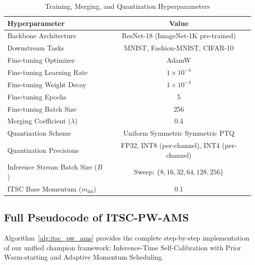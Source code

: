 \documentclass{article}
\theoremstyle{plain}
\theoremstyle{definition}
\theoremstyle{remark}
\begin{document}
\begin{table}[h]
  \caption{Training, Merging, and Quantization Hyperparameters}
  \label{tab:hyperparams}
  \centering
  \begin{tabular}{lc}
    \toprule
    \textbf{Hyperparameter} & \textbf{Value} \\
    \midrule
    Backbone Architecture & ResNet-18 (ImageNet-1K pre-trained) \\
    Downstream Tasks & MNIST, Fashion-MNIST, CIFAR-10 \\
    Fine-tuning Optimizer & AdamW \\
    Fine-tuning Learning Rate & $1 \times 10^{-4}$ \\
    Fine-tuning Weight Decay & $1 \times 10^{-4}$ \\
    Fine-tuning Epochs & 5 \\
    Fine-tuning Batch Size & 256 \\
    Merging Coefficient ($\lambda$) & 0.4 \\
    Quantization Scheme & Uniform Symmetric Symmetric PTQ \\
    Quantization Precisions & FP32, INT8 (per-channel), INT4 (per-channel) \\
    Inference Stream Batch Size ($B$) & Sweep: $\{8, 16, 32, 64, 128, 256\}$ \\
    ITSC Base Momentum ($m_{\text{inf}}$) & 0.1 \\
    \bottomrule
  \end{tabular}
\end{table}

\subsection{Full Pseudocode of ITSC-PW-AMS}
Algorithm~\ref{alg:itsc_pw_ams} provides the complete step-by-step implementation of our unified champion framework: Inference-Time Self-Calibration with Prior Warm-starting and Adaptive Momentum Scheduling.
\end{document}
